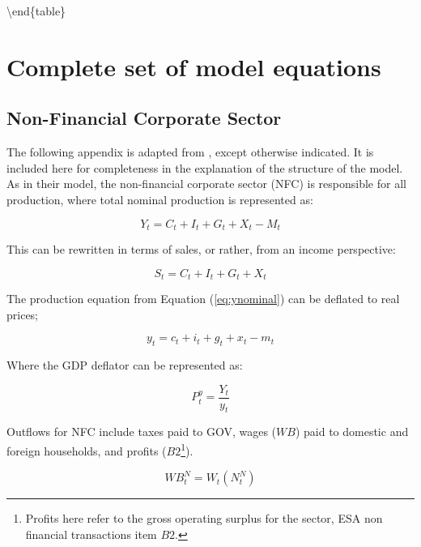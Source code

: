 \documentclass[
]{book}
\begin{document}
\textbackslash end\{table\}

\hypertarget{sec:fi-fl-sfc-full-model}{%
\section{Complete set of model equations}\label{sec:fi-fl-sfc-full-model}}

\hypertarget{sec:fi-fl-sfc-model-eq-nf}{%
\subsection{Non-Financial Corporate Sector}\label{sec:fi-fl-sfc-model-eq-nf}}

The following appendix is adapted from \citet{byrialsenraza2019empirical}, except otherwise indicated.
It is included here for completeness in the explanation of the structure of
the model. As in their model, the non-financial corporate sector (NFC) is responsible for all production,
where total nominal production is represented as:

\begin{equation}
Y_t = C_t + I_t + G_t + X_t - M_t
\label{eq:ynominal}
\end{equation}

This can be rewritten in terms of sales, or rather, from an income perspective:

\begin{equation}
S_t = C_t + I_t + G_t + X_t
\label{eq:nfcsales}
\end{equation}

The production equation from Equation (\ref{eq:ynominal}) can be deflated to real prices;

\begin{equation}
y_t = c_t + i_t + g_t + x_t - m_t
\end{equation}

Where the GDP deflator can be represented as:

\begin{equation}
P^y_t = \frac{Y_t}{y_t}
\end{equation}

Outflows for NFC include taxes paid to GOV, wages (\(WB\)) paid to domestic and foreign households, and profits (\(B2\)\footnote{Profits here refer to the gross operating surplus for the sector, ESA non financial transactions item \(B2\).}).

\begin{equation}
WB^N_t = W_t(N^N_t)
\end{equation}
\end{document}
